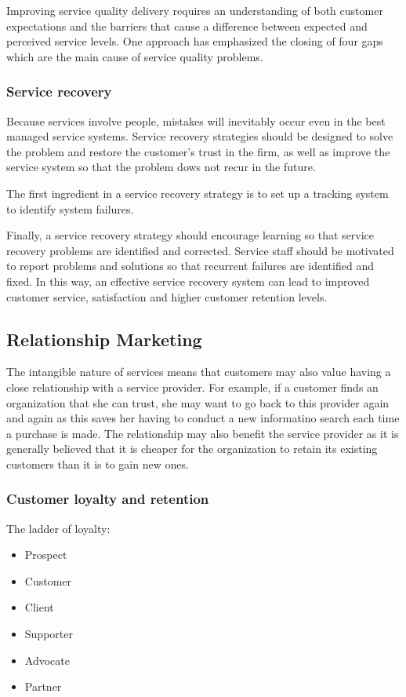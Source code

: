 \documentclass{article}
\begin{document}
Improving service quality delivery requires an understanding of both customer expectations and the barriers that cause a difference between expected and perceived service levels. One approach has emphasized the closing of four gaps which are the main cause of service quality problems.

\subsubsection*{Service recovery}
Because services involve people, mistakes will inevitably occur even in the best managed service systems. Service recovery strategies should be designed to solve the problem and restore the customer's trust in the firm, as well as improve the service system so that the problem dows not recur in the future. 

The first ingredient in a service recovery strategy is to set up a tracking system to identify system failures. 

Finally, a service recovery strategy should encourage learning so that service recovery problems are identified and corrected. Service staff should be motivated to report problems and solutions so that recurrent failures are identified and fixed. In this way, an effective service recovery system can lead to improved customer service, satisfaction and higher customer retention levels.

\subsection{Relationship Marketing}
The intangible nature of services means that customers may also value having a close relationship with a service provider. For example, if a customer finds an organization that she can trust, she may want to go back to this provider again and again as this saves her having to conduct a new informatino search each time a purchase is made. The relationship may also benefit the service provider as it is generally believed that it is cheaper for the organization to retain its existing customers than it is to gain new ones.

\subsubsection*{Customer loyalty and retention}
The ladder of loyalty:
\begin{itemize}
    \item Prospect
    \item Customer
    \item Client
    \item Supporter
    \item Advocate
    \item Partner
\end{itemize}
\end{document}
